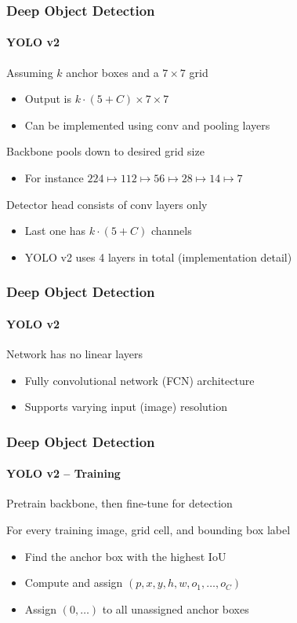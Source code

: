 \documentclass[xetex,professionalfont]{beamer}
\renewcommand\emph[1]{\textcolor{tuwcvl_cvl_blue}{#1}}
\begin{document}
\begin{frame}
	\frametitle{Deep Object Detection}
	\framesubtitle{YOLO v2}

	Assuming $k$ anchor boxes and a $7\times7$ grid
	\begin{itemize}
		\item Output is $k\cdot(5+C)\times7\times7$
		\item Can be implemented using conv and pooling layers
	\end{itemize}

	\bigskip

	Backbone pools down to desired grid size
	\begin{itemize}
		\item For instance $224\mapsto112\mapsto56\mapsto28\mapsto14\mapsto7$
	\end{itemize}

	\bigskip

	\emph{Detector head} consists of conv layers only
	\begin{itemize}
		\item Last one has $k\cdot(5+C)$ channels
		\item YOLO v2 uses 4 layers in total (implementation detail)
	\end{itemize}

\end{frame}


\begin{frame}
	\frametitle{Deep Object Detection}
	\framesubtitle{YOLO v2}

	Network has no linear layers
	\begin{itemize}
		\item \emph{Fully convolutional network} (\emph{FCN}) architecture
		\item Supports varying input (image) resolution
	\end{itemize}

\end{frame}


\begin{frame}
	\frametitle{Deep Object Detection}
	\framesubtitle{YOLO v2 -- Training}

	Pretrain backbone, then fine-tune for detection

	\bigskip

	For every training image, grid cell, and bounding box label
	\begin{itemize}
		\item Find the anchor box with the highest IoU
		\item Compute and assign $(p,x,y,h,w,o_1,\dots,o_C)$
		\item Assign $(0,\dots)$ to all unassigned anchor boxes
	\end{itemize}

\end{frame}
\end{document}
